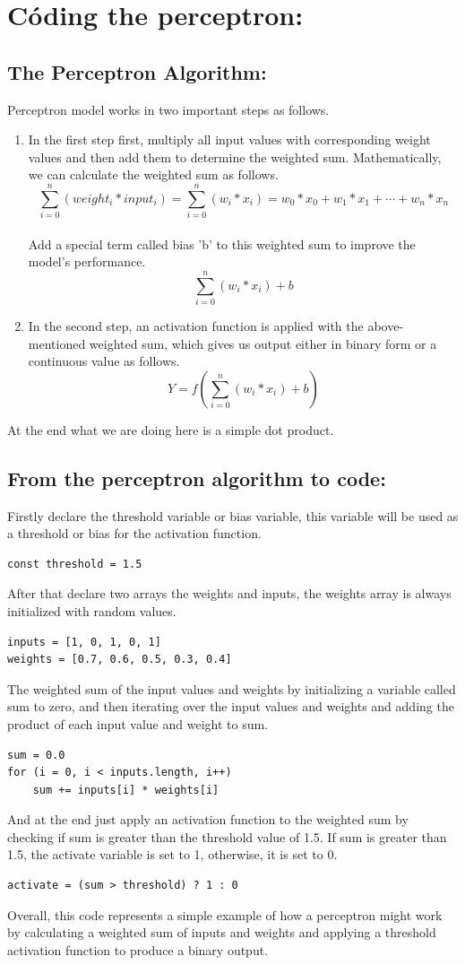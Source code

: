 \documentclass[12pt]{article}
\begin{document}
\section{Códing the perceptron:}
\subsection{The Perceptron Algorithm:}
Perceptron model works in two important steps as follows.
\begin{enumerate}
\item In the first step first, multiply all input values with corresponding weight values and then add
  them to determine the weighted sum. Mathematically, we can calculate the weighted sum as follows.\\
  \[
    \sum_{i = 0}^{n}(weight_i * input_i) = \sum_{i = 0}^{n}(w_i * x_i) = w_0 * x_0 + w_1 * x_1
    + \cdots + w_n * x_n
  \]\\
  Add a special term called bias 'b' to this weighted sum to improve the model's performance.\\
  \[
    \sum_{i = 0}^{n}(w_i * x_i) + b
  \]
\item In the second step, an activation function is applied with the above-mentioned weighted sum,
  which gives us output either in binary form or a continuous value as follows.\\
  \[
    Y = f(\sum_{i = 0}^{n}(w_i * x_i) + b)
  \]
\end{enumerate}
At the end what we are doing here is a simple dot product.
\subsection{From the perceptron algorithm to code:}
Firstly declare the threshold variable or bias variable,
this variable will be used as a threshold or bias for the activation function.
\begin{verbatim}
const threshold = 1.5
\end{verbatim}
After that declare two arrays the weights and inputs, the weights array is always initialized with random
values.
\begin{verbatim}
inputs = [1, 0, 1, 0, 1]
weights = [0.7, 0.6, 0.5, 0.3, 0.4]
\end{verbatim}
The weighted sum of the input values and weights by initializing a variable called sum to zero,
and then iterating over the input values and weights and adding the product of each input value
and weight to sum.
\begin{verbatim}
sum = 0.0
for (i = 0, i < inputs.length, i++)
    sum += inputs[i] * weights[i]
\end{verbatim}
And at the end just apply an activation function to the weighted sum by checking if sum is greater
than the threshold value of 1.5. If sum is greater than 1.5,
the activate variable is set to 1, otherwise, it is set to 0.
\begin{verbatim}
activate = (sum > threshold) ? 1 : 0
\end{verbatim}
Overall, this code represents a simple example of how a perceptron might work by calculating a
weighted sum of inputs and weights and applying a threshold activation function to produce a
binary output.
\end{document}

